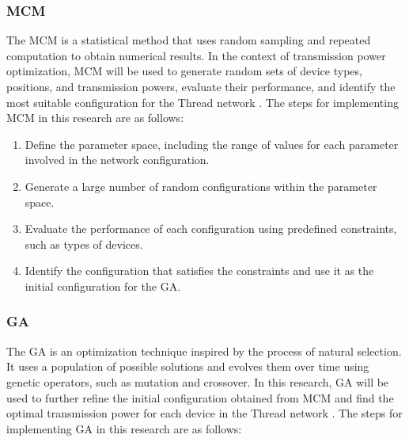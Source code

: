 \subsubsection{\acrlong{MCM}}

The \acrfull{MCM} is a statistical method that uses random sampling and repeated computation to obtain numerical results. In the context of transmission power optimization, \gls{MCM} will be used to generate random sets of device types, positions, and transmission powers, evaluate their performance, and identify the most suitable configuration for the Thread network \cite{kroese2014monte}. The steps for implementing \gls{MCM} in this research are as follows:

\begin{enumerate}
    \item Define the parameter space, including the range of values for each parameter involved in the network configuration.
    \item Generate a large number of random configurations within the parameter space.
    \item Evaluate the performance of each configuration using predefined constraints, such as types of devices.
    \item Identify the configuration that satisfies the constraints and use it as the initial configuration for the GA.
\end{enumerate}

\subsubsection{\acrlong{GA}}

The \acrfull{GA} is an optimization technique inspired by the process of natural selection. It uses a population of possible solutions and evolves them over time using genetic operators, such as mutation and crossover. In this research, \gls{GA} will be used to further refine the initial configuration obtained from \gls{MCM} and find the optimal transmission power for each device in the Thread network \cite{lambora2019genetic}. The steps for implementing \gls{GA} in this research are as follows:

